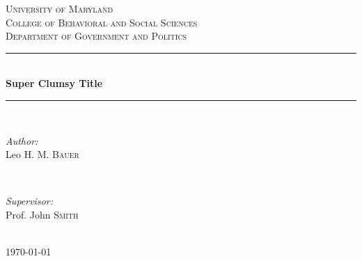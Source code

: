 \documentclass[12pt]{article} %
\begin{document}
	
\setlength{\parindent}{0.5cm}
\parskip=0pt


\begin{titlepage}

\newcommand{\HRule}{\rule{\linewidth}{0.5mm}} %

\centering

\textsc{\LARGE University of Maryland}\\[1.5cm] %
\textsc{\Large College of Behavioral and Social Sciences}\\[0.5cm] %
\textsc{\large Department of Government and Politics}\\[0.5cm] %

\HRule \\[1.5cm]
{ \huge \bfseries Super Clumsy Title}\\[1cm] %
\HRule \\[1.5cm]

\begin{minipage}{0.4\textwidth}
\begin{flushleft} \large
\emph{Author:}\\
Leo H. M. \textsc{Bauer} %
\end{flushleft}
\end{minipage}
~
\begin{minipage}{0.4\textwidth}
\begin{flushright} \large
\emph{Supervisor:} \\
Prof. John \textsc{Smith} %
\end{flushright}
\end{minipage}\\[4cm]

{\large \today}\\[3cm] %


\vfill %

\end{titlepage}
\end{document}
